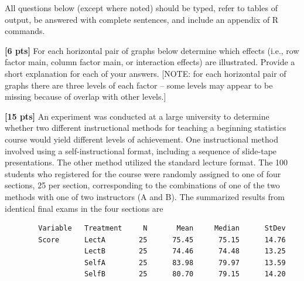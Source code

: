 \documentclass[10pt,openany]{book}\usepackage[]{graphicx}\usepackage[]{color}
\begin{document}
\begin{hwsection}{All questions below (except where noted) should be typed, refer to tables of output, be answered with complete sentences, and include an appendix of R commands.}
\vspace{-12pt}
  \item \label{hwprob:LMANOVA23} \textbf{[6 pts]} For each horizontal pair of graphs below determine which effects (i.e., row factor main, column factor main, or interaction effects) are illustrated.  Provide a short explanation for each of your answers.  [NOTE: for each horizontal pair of graphs there are three levels of each factor -- some levels may appear to be missing because of overlap with other levels.]




      \begin{Enumerate}
        \item {}
        \item {}
        \item {}
      \end{Enumerate}

\clearpage
  \item \label{hwprob:LMANOVA22} \textbf{[15 pts]} An experiment was conducted at a large university to determine whether two different instructional methods for teaching a beginning statistics course would yield different levels of achievement.  One instructional method involved using a self-instructional format, including a sequence of slide-tape presentations.  The other method utilized the standard lecture format.  The 100 students who registered for the course were randomly assigned to one of four sections, 25 per section, corresponding to the combinations of one of the two methods with one of two instructors (A and B).  The summarized results from identical final exams in the four sections are

    \begin{Verbatim}
        Variable   Treatment     N       Mean     Median      StDev
        Score      LectA        25      75.45      75.15      14.76
                   LectB        25      74.46      74.48      13.25
                   SelfA        25      83.98      79.97      13.59
                   SelfB        25      80.70      79.15      14.20
    \end{Verbatim}


\end{hwsection}
\end{document}
